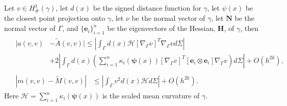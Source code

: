 \documentclass{siamart0516}
\newcommand{\N}{\mathbf{N}}
\numberwithin{equation}{section}
\numberwithin{theorem}{section}
\numberwithin{figure}{section}
\begin{document}
\begin{lemma}
Let $v\in H_\#^1(\gamma)$, let $d(x)$ be the signed distance function for $\gamma$, let $\psi(x)$ be the closest point projection onto $\gamma$, let $\nu$ be the normal vector of $\gamma$, let $\N$ be the normal vector of $\Gamma$, and $\{\mathbf{e}_i\}_{i=1}^n$ be the eigenvectors of the Hessian, $\mathbf{H}$, of $\gamma$, then 	
\begin{align}
&\begin{aligned}
|a(v,v)& -\widetilde{A}(v,v)| \leq
\left|\int_{\Gamma}d(x)\mathcal{H}\left[\nabla_{\Gamma}v\right]^T\nabla_\Gamma v d\Sigma\right|\\
&+2\left|\int_{\Gamma}d(x)\left(\sum_{i=1}^n\kappa_i(\mathbf{\psi}(x))\left[\nabla_{\Gamma}v\right]^T\left[ \mathbf{e}_i\otimes\mathbf{e}_i 
\right]\nabla_\Gamma v \right)d\Sigma\right| + O(h^{2k}),
\label{StiffBound}	
\end{aligned}
\\
&\begin{aligned}
\left|m(v,v)-\widetilde{M}(v,v)\right|&\leq\left|\int_{\Gamma}v^2d(x)\mathcal{H}d\Sigma \right|+ O(h^{2k}).
\label{massbound}
\end{aligned}
\end{align}
Here $\mathcal{H} = \sum_{i=1}^n\kappa_i(\mathbf{\psi}(x))$ is the scaled mean curvature of $\gamma$.
\end{lemma}	
\end{document}
